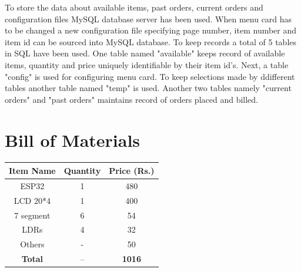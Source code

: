 \documentclass[12pt,a4paper]{article}
\begin{document}
		\begin{info}
		To store the data about available items, past orders, current orders and configuration files MySQL database server has been used. When menu card has to be changed a new configuration file specifying page number, item number and item id can be sourced into MySQL database. To keep records a total of 5 tables in SQL have been used. One table named "available" keeps record of available items, quantity and price uniquely identifiable by their item id's. Next, a table "config" is used for configuring menu card. To keep selections made by ddifferent tables another table named "temp" is used. Another two tables namely "current orders" and "past orders" maintains record of orders placed and billed.
		\end{info}
	    \section{Bill of Materials}
	    \begin{center}
		    \begin{tabular}{|c|c|c|}
		    	\hline
		    	\textbf{Item Name} & \textbf{Quantity} & \textbf{Price (Rs.)} \\
		    	\hline
		    	ESP32 & 1 & 480\\
		    	\hline
		    	LCD 20*4 & 1 & 400\\
		    	\hline
		    	7 segment & 6 & 54\\
		    	\hline
		    	LDRs & 4 & 32\\
		    	\hline
		    	Others & - & 50\\
		    	\hline
		    	\textbf{Total} & -- & \textbf{1016}\\
		    	\hline
			\end{tabular}

	    \end{center}
	    
\end{document}
